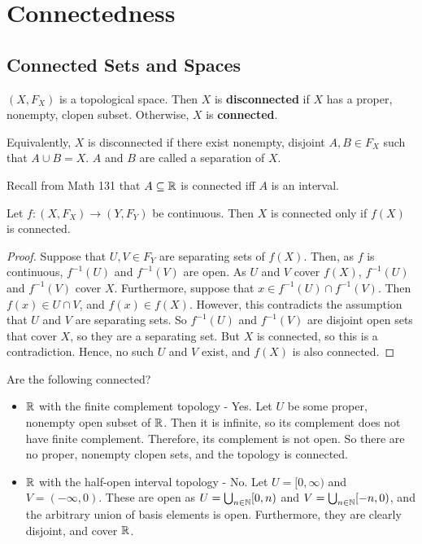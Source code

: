 

\section{Connectedness} 
\subsection{Connected Sets and Spaces} 
\begin{definition}
	$(X,F_X)$ is a topological space. Then $X$ is \textbf{disconnected} if $X$ has a proper, nonempty, clopen subset. Otherwise, $X$ is \textbf{connected}.
	
	Equivalently, $X$ is disconnected if there exist nonempty, disjoint $A,B \in F_X$ such that $A \cup B = X$. $A$ and $B$ are called a separation of $X$. 
\end{definition}

Recall from Math 131 that $A \subseteq \mathbb R$ is connected iff $A$ is an interval. 
\begin{theorem}
	Let $f : (X,F_X) \to (Y,F_Y)$ be continuous. Then $X$ is connected only if $f(X)$ is connected. 
\end{theorem}
\begin{proof}
	Suppose that $U,V \in F_Y$ are separating sets of $f(X)$. Then, as $f$ is continuous, $f^{-1}(U)$ and $f^{-1}(V)$ are open. As $U$ and $V$ cover $f(X)$, $f^{-1}(U)$ and $f^{-1}(V)$ cover $X$. Furthermore, suppose that $x \in f^{-1}(U) \cap f^{-1}(V)$. Then $f(x) \in U \cap V$, and $f(x) \in f(X)$. However, this contradicts the assumption that $U$ and $V$ are separating sets. So $f^{-1}(U)$ and $f^{-1}(V)$ are disjoint open sets that cover $X$, so they are a separating set. But $X$ is connected, so this is a contradiction. Hence, no such $U$ and $V$ exist, and $f(X)$ is also connected. 
\end{proof}

Are the following connected? 
\begin{itemize}
	\item $\mathbb R$ with the finite complement topology - Yes. Let $U$ be some proper, nonempty open subset of $\mathbb R$. Then it is infinite, so its complement does not have finite complement. Therefore, its complement is not open. So there are no proper, nonempty clopen sets, and the topology is connected. 
	\item $\mathbb R$ with the half-open interval topology - No. Let $U = [0,\infty)$ and $V = (-\infty,0)$. These are open as $U = \bigcup_{n\in \mathbb N} [0,n)$ and $V = \bigcup_{n \in \mathbb N} [-n,0)$, and the arbitrary union of basis elements is open. Furthermore, they are clearly disjoint, and cover $\mathbb R$. 
\end{itemize}

